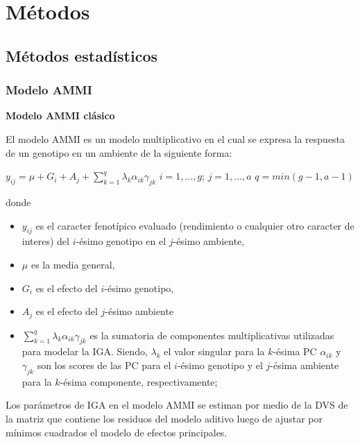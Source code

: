 
\chapter{Métodos}
\section{Métodos estadísticos}

\subsection{Modelo AMMI}

\textbf{Modelo AMMI clásico}

El modelo AMMI es un modelo multiplicativo en el cual se expresa la respuesta de un genotipo en un ambiente de la siguiente forma:
\begin{center}
$y_{ij}= \mu +G_i + A_j + \sum_{k=1}^q \lambda_k \alpha_{ik} \gamma_{jk}$ \vspace{1cm} $ i=1,...,g$; $ j=1,...,a$ $q=min(g-1,a-1)$
\end{center}
donde 
\begin{itemize}
\item $y_{ij}$ es el caracter fenotípico evaluado (rendimiento o cualquier otro caracter de interes) del $i$-ésimo genotipo en el $j$-ésimo ambiente,
\item $\mu$ es la media general,
\item  $G_i$ es el efecto del $i$-ésimo genotipo,
\item $A_j$ es el efecto del $j$-ésimo ambiente
\item $\sum_{k=1}^q \lambda_k \alpha_{ik} \gamma_{jk}$ es la sumatoria de componentes multiplicativas utilizadas para modelar la IGA. Siendo, $\lambda_k$ el valor singular para la  $k$-ésima PC $\alpha_{ik}$ y $\gamma_{jk}$ son los scores de las PC para el $i$-ésimo genotipo y el $j$-ésima ambiente para la $k$-ésima componente, respectivamente;
\end{itemize}

Los parámetros de IGA en el modelo AMMI se estiman por medio de la DVS de la matriz que contiene los residuos del modelo aditivo luego de ajustar por mínimos cuadrados el modelo de efectos principales.

